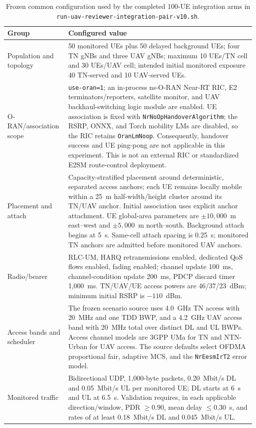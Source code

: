 \begin{table}[t]
\centering
\footnotesize
\caption{Frozen common configuration used by the completed 100-UE integration arms in \texttt{run-\allowbreak uav-\allowbreak reviewer-\allowbreak integration-\allowbreak pair-\allowbreak v10.sh}.}
\label{tab:audited_network_configuration}
\begin{tabular}{p{} p{}}
\hline
Group & Configured value \\
\hline
Population and topology & 50 monitored UEs plus 50 delayed background UEs; four TN gNBs and three UAV gNBs; maximum 10 UEs/TN cell and 30 UEs/UAV cell; intended initial monitored exposure 40 TN-served and 10 UAV-served UEs. \\
O-RAN/association scope & \texttt{use-oran=1}; an in-process ns-O-RAN Near-RT RIC, E2 terminators/reporters, satellite monitor, and UAV backhaul-switching logic module are enabled.  UE association is fixed with \texttt{Nr\allowbreak No\allowbreak Op\allowbreak Handover\allowbreak Algorithm}; the RSRP, ONNX, and Torch mobility LMs are disabled, so the RIC retains \texttt{OranLmNoop}.  Consequently, handover success and UE ping-pong are not applicable in this experiment.  This is not an external RIC or standardized E2SM route-control deployment. \\
Placement and attach & Capacity-stratified placement around deterministic, separated access anchors; each UE remains locally mobile within a 25~m half-width/height cluster around its TN/UAV anchor.  Initial association uses explicit anchor attachment.  UE global-area parameters are $\pm10{,}000$~m east--west and $\pm5{,}000$~m north--south.  Background attach begins at 5~s.  Same-cell attach spacing is 0.25~s; monitored TN anchors are admitted before monitored UAV anchors. \\
Radio/bearer & RLC-UM, HARQ retransmissions enabled, dedicated QoS flows enabled, fading enabled; channel update 100~ms, channel-condition update 200~ms, PDCP discard timer 1,000~ms.  TN/UAV/UE access powers are 46/37/23~dBm; minimum initial RSRP is $-110$~dBm. \\
Access bands and scheduler & The frozen scenario source uses 4.0~GHz TN access with 20~MHz and one TDD BWP, and a 4.2~GHz UAV access band with 20~MHz total over distinct DL and UL BWPs. Access channel models are 3GPP UMa for TN and NTN-Urban for UAV access. The source defaults select OFDMA proportional fair, adaptive MCS, and the \texttt{NrEesmIrT2} error model. \\
Monitored traffic & Bidirectional UDP, 1,000-byte packets, 0.20~Mbit/s DL and 0.05~Mbit/s UL per monitored UE; DL starts at 6~s and UL at 6.5~s.  Validation requires, in each applicable direction/window, PDR $\geq0.90$, mean delay $\leq0.30$~s, and rates of at least 0.18~Mbit/s DL and 0.045~Mbit/s UL. \\

\end{tabular}
\end{table}
